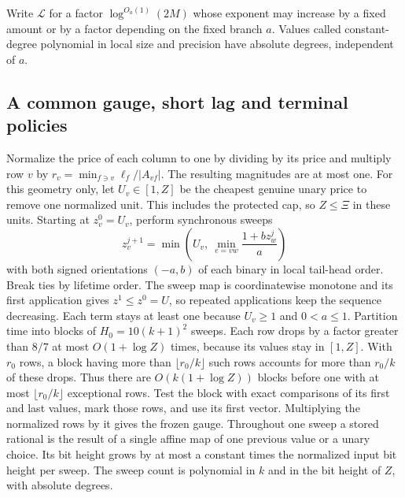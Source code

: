 \documentclass[11pt]{article}
\begin{document}
Write \(\mathcal L\) for a factor \(\log^{O_a(1)}(2M)\) whose exponent may increase by a fixed amount or by a factor depending on the fixed branch \(a\). Values called constant-degree polynomial in local size and precision have absolute degrees, independent of \(a\).

\hypertarget{a-common-gauge-short-lag-and-terminal-policies}{%
\subsection{A common gauge, short lag and terminal policies}\label{a-common-gauge-short-lag-and-terminal-policies}}

Normalize the price of each column to one by dividing by its price and multiply row \(v\) by \(r_v=\min_{f\ni v}\ell_f/|A_{vf}|\). The resulting magnitudes are at most one. For this geometry only, let \(U_v\in[1,Z]\) be the cheapest genuine unary price to remove one normalized unit. This includes the protected cap, so \(Z\le\Xi\) in these units. Starting at \(z^0_v=U_v\), perform synchronous sweeps
\[
 z^{j+1}_v=\min\left(U_v,\ \min_{e=vw}\frac{1+b z^j_w}{a}\right)
\]
with both signed orientations \((-a,b)\) of each binary in local tail-head order. Break ties by lifetime order. The sweep map is coordinatewise monotone and its first application gives \(z^1\le z^0=U\), so repeated applications keep the sequence decreasing. Each term stays at least one because \(U_v\ge1\) and \(0<a\le1\). Partition time into blocks of \(H_0=10(k+1)^2\) sweeps. Each row drops by a factor greater than \(8/7\) at most \(O(1+\log Z)\) times, because its values stay in \([1,Z]\). With \(r_0\) rows, a block having more than \(\lfloor r_0/k\rfloor\) such rows accounts for more than \(r_0/k\) of these drops. Thus there are \(O(k(1+\log Z))\) blocks before one with at most \(\lfloor r_0/k\rfloor\) exceptional rows. Test the block with exact comparisons of its first and last values, mark those rows, and use its first vector. Multiplying the normalized rows by it gives the frozen gauge. Throughout one sweep a stored rational is the result of a single affine map of one previous value or a unary choice. Its bit height grows by at most a constant times the normalized input bit height per sweep. The sweep count is polynomial in \(k\) and in the bit height of \(Z\), with absolute degrees.
\end{document}
